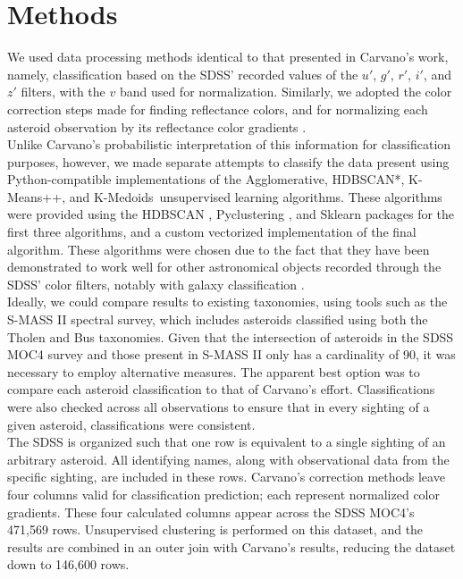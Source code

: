 \documentclass[conference]{IEEEtran}
\def \algorithmsToUse {Agglomerative, HDBSCAN*, K-Means++, and K-Medoids}
\begin{document}
\section{Methods}
We used data processing methods identical to that presented in Carvano's \cite{Carvano} work, namely, classification based on the SDSS' recorded values of the $u'$, $g'$, $r'$, $i'$, and $z'$ filters, with the $v$ band used for normalization.
Similarly, we adopted the color correction steps made for finding reflectance \cite{Carvano} colors, and for normalizing each asteroid observation by its reflectance color gradients \cite{Carvano}.
\\

Unlike Carvano's probabilistic interpretation of this information for classification purposes, however, we made separate attempts to classify the data present using Python-compatible implementations of the \algorithmsToUse\ unsupervised learning algorithms.
These algorithms were provided using the HDBSCAN \cite{mcinnes2017hdbscan}, Pyclustering \cite{andrei_novikov_2018_1254845}, and Sklearn \cite{scikit-learn} packages for the first three algorithms, and a custom vectorized implementation of the final algorithm.
These algorithms were chosen due to the fact that they have been demonstrated to work well for other astronomical objects recorded through the SDSS' color filters, notably with galaxy classification \cite{sanchez_galaxies}.
\\

Ideally, we could compare results to existing taxonomies, using tools such as the S-MASS II spectral survey, which includes asteroids classified using both the Tholen and Bus \cite{bus_thesis} taxonomies.
Given that the intersection of asteroids in the SDSS MOC4 survey and those present in S-MASS II only has a cardinality of 90, it was necessary to employ alternative measures.
The apparent best option was to compare each asteroid classification to that of Carvano's effort.
Classifications were also checked across all observations to ensure that in every sighting of a given asteroid, classifications were consistent.
\\

The SDSS is organized such that one row is equivalent to a single sighting of an arbitrary asteroid.
All identifying names, along with observational data from the specific sighting, are included in these rows.
Carvano's correction methods leave four columns valid for classification prediction; each represent normalized color gradients.
These four calculated columns appear across the SDSS MOC4's 471,569 rows. Unsupervised clustering is performed on this dataset, and the results are combined in an outer join with Carvano's results, reducing the dataset down to 146,600 rows.
\\
\end{document}
